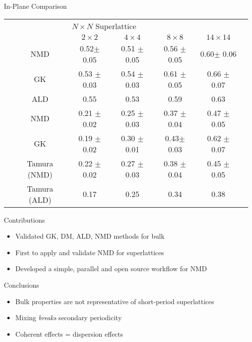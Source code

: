 \documentclass{beamer}
\begin{document}
\begin{frame}{In-Plane Comparison}
\begin{center}
\resizebox{\linewidth}{!}
\begin{tabular*}{\textwidth}{c@{\extracolsep{\fill}}cccccc}
\hline\hline\noalign{\smallskip}
\multicolumn{2}{c}{\multirow{2}{*}{In-Plane}}&\multicolumn{4}{c}{$N\times N$ Superlattice} \\
\cline{3-6}\noalign{\smallskip}
\hspace{1cm} && $2\times2$ & $4\times4$ & $8\times8$ & $14\times14$  \\
\noalign{\smallskip}\hline\noalign{\smallskip}
\multirow{2}{*}{Perfect} &NMD &0.52$\pm$ 0.05 & 0.51 $\pm$ 0.05& 0.56 $\pm$ 0.05& 0.60$\pm$ 0.06\\
&GK &0.53 $\pm$ 0.03 &  0.54 $\pm$ 0.03 &  0.61 $\pm$ 0.05  &  0.66 $\pm$ 0.07 \\
&ALD & 0.55	& 0.53	&	0.59 	&0.63\\
\noalign{\smallskip}\hline
\multirow{3}{*}{Mixed} & NMD &0.21 $\pm$ 0.02 & 0.25 $\pm$ 0.03 & 0.37 $\pm$ 0.04 & 0.47  $\pm$ 0.05\\
&GK & 0.19 $\pm$ 0.02 &  0.30 $\pm$ 0.01  & 0.43$\pm$ 0.03 &  0.62 $\pm$ 0.07 \\   
&Tamura (NMD)& 0.22 $\pm$ 0.02 & 0.27 $\pm$ 0.03 & 0.38 $\pm$ 0.04 & 0.45 $\pm$ 0.05\\
&Tamura (ALD) & 0.17 & 0.25 & 0.34 &0.38\\
\hline\hline
\end{tabular*}
\end{center}
\renewcommand{\table}{Table.}
\caption{A comparison of the in-plane thermal conductivity predictions [W/m K].}
\label{TB:K_IP}
\end{frame}

\begin{frame}{Contributions}
\begin{itemize}
\item Validated GK, DM, ALD, NMD methods for bulk
\item First to apply and validate NMD for superlattices
\item Developed a simple, parallel and open source workflow for NMD
\end{itemize}
\end{frame}

\begin{frame}{Conclusions}
\begin{itemize}
\item Bulk properties are not representative of short-period superlattices
\item Mixing \textit{breaks} secondary periodicity
\item Coherent effects = dispersion effects
\end{itemize}
\end{frame}

\end{document}
